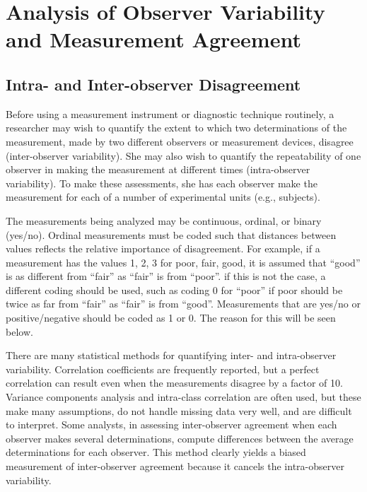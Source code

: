 

\chapter{Analysis of Observer Variability and Measurement
  Agreement}\label{chap:obsvar}
\section{Intra- and Inter-observer Disagreement}
Before using a measurement instrument or diagnostic technique
routinely, a researcher may wish to quantify the extent to which two
determinations of the measurement, made by two different observers
or measurement devices, disagree (inter-observer variability).  She
may also wish to quantify the repeatability of one observer in making
the measurement at different times (intra-observer variability). To
make these assessments, she has each observer make the measurement
for each of a number of experimental units (e.g., subjects).

The measurements being analyzed may be continuous, ordinal, or binary
(yes/no). Ordinal measurements must be coded such that distances between
values reflects the relative importance of disagreement. For example, if a
measurement has the values 1, 2, 3 for poor, fair, good, it is assumed that
``good'' is as different from ``fair'' as ``fair'' is from
``poor''. if this is  not the case, a different coding should be used,
such as coding 0 for ``poor'' if poor should be twice as far from
``fair'' as ``fair'' is from ``good''. Measurements that are yes/no or
positive/negative should be coded as 1 or 0. The reason for this will
be seen below.  

There are many statistical methods for quantifying inter- and
intra-observer variability.  Correlation coefficients are frequently reported,
but a perfect correlation can result even when the measurements disagree by a
factor of 10.  Variance components analysis and intra-class
correlation are often used, but these make many assumptions, do not
handle missing data very well, and are difficult to interpret. Some
analysts, in assessing 
inter-observer agreement when each observer makes several determinations,
compute differences between the average determinations for each observer.
This method clearly yields a biased measurement of inter-observer agreement
because it cancels the intra-observer variability.

